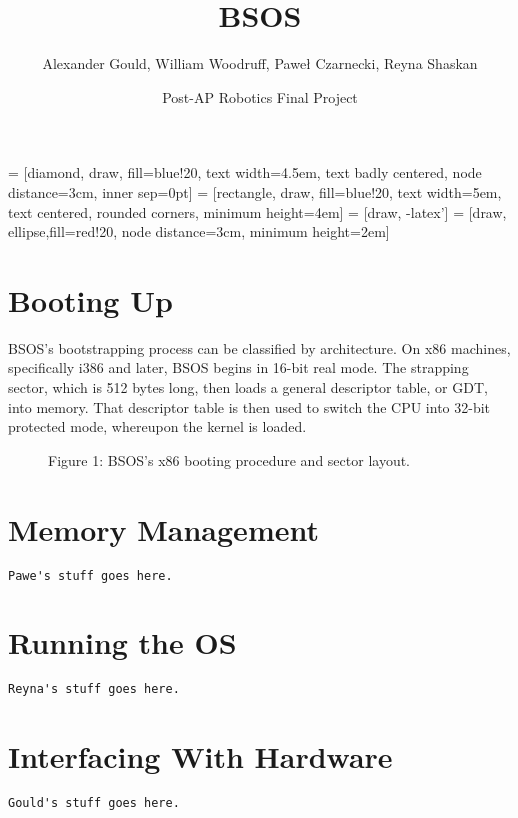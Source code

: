 \documentclass[english]{article}
\begin{document}
 = [diamond, draw, fill=blue!20, 
    text width=4.5em, text badly centered, node distance=3cm, inner sep=0pt]
 = [rectangle, draw, fill=blue!20, 
    text width=5em, text centered, rounded corners, minimum height=4em]
 = [draw, -latex']
 = [draw, ellipse,fill=red!20, node distance=3cm,
    minimum height=2em]

\title{BSOS}
\author{Alexander Gould, William Woodruff, Pawe\l{} Czarnecki, Reyna Shaskan}
\date{Post-AP Robotics Final Project}
\maketitle

\begin{abstract}

\end{abstract}

\section{Booting Up}
BSOS's bootstrapping process can be classified by architecture. On x86 machines, specifically i386 and later, BSOS begins in 16-bit real mode. The strapping sector, which is 512 bytes long, then loads a general descriptor table, or GDT, into memory. That descriptor table is then used to switch the CPU into 32-bit protected mode, whereupon the kernel is loaded.

\begin{figure}[h!]

\caption{Figure 1: BSOS's x86 booting procedure and sector layout.}
\end{figure}

\section{Memory Management}

\begin{lstlisting}
Pawe's stuff goes here.
\end{lstlisting}



\section{Running the OS}

\begin{lstlisting}
Reyna's stuff goes here.
\end{lstlisting}



\section{Interfacing With Hardware}

\begin{lstlisting}
Gould's stuff goes here.
\end{lstlisting}
\end{document}
